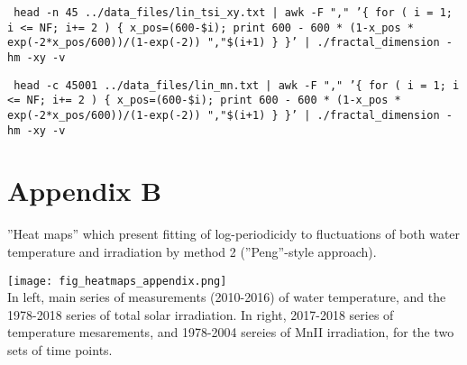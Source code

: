 \documentclass[a4paper]{article}
\begin{document}
\texttt{\small{ head -n 45 ../data\_files/lin\_tsi\_xy.txt | awk -F "," '\{ for ( i = 1; i <= NF; i+= 2 ) \{ x\_pos=(600-\$i); print 600 - 600 * (1-x\_pos * exp(-2*x\_pos/600))/(1-exp(-2)) ","\$(i+1) \} \}' | ./fractal\_dimension -hm -xy -v } }

\texttt{\small{ head -c 45001 ../data\_files/lin\_mn.txt | awk -F "," '\{ for ( i = 1; i <= NF; i+= 2 ) \{ x\_pos=(600-\$i); print 600 - 600 * (1-x\_pos * exp(-2*x\_pos/600))/(1-exp(-2)) ","\$(i+1) \} \}' | ./fractal\_dimension -hm -xy -v } }


\newpage
\section*{Appendix B}

''Heat maps'' which present fitting of log-periodicidy to fluctuations of both water temperature and irradiation by method 2 (''Peng''-style approach).

\noindent
\texttt{[image: fig\_heatmaps\_appendix.png]}\\

In left, main series of measurements (2010-2016) of water temperature, and the 1978-2018 series of total solar irradiation. In right, 2017-2018 series of temperature mesarements, and 1978-2004 sereies of MnII irradiation, for the two sets of time points.
\end{document}
